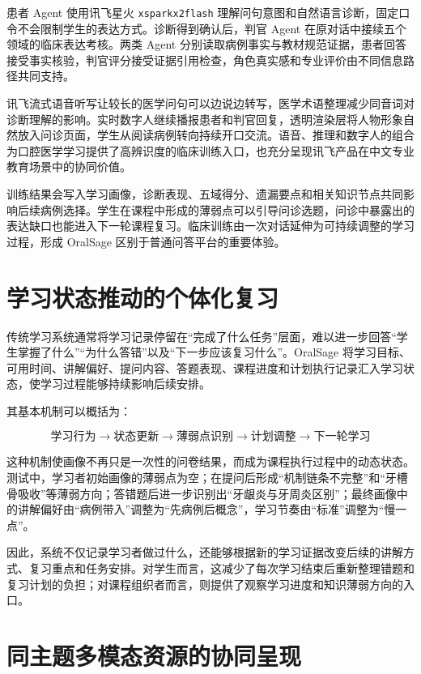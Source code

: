 患者 Agent 使用讯飞星火 \texttt{xsparkx2flash} 理解问句意图和自然语言诊断，固定口令不会限制学生的表达方式。诊断得到确认后，判官 Agent 在原对话中接续五个领域的临床表达考核。两类 Agent 分别读取病例事实与教材规范证据，患者回答接受事实核验，判官评分接受证据引用检查，角色真实感和专业评价由不同信息路径共同支持。

讯飞流式语音听写让较长的医学问句可以边说边转写，医学术语整理减少同音词对诊断理解的影响。实时数字人继续播报患者和判官回复，透明渲染层将人物形象自然放入问诊页面，学生从阅读病例转向持续开口交流。语音、推理和数字人的组合为口腔医学学习提供了高辨识度的临床训练入口，也充分呈现讯飞产品在中文专业教育场景中的协同价值。

训练结果会写入学习画像，诊断表现、五域得分、遗漏要点和相关知识节点共同影响后续病例选择。学生在课程中形成的薄弱点可以引导问诊选题，问诊中暴露出的表达缺口也能进入下一轮课程复习。临床训练由一次对话延伸为可持续调整的学习过程，形成 OralSage 区别于普通问答平台的重要体验。

\section{学习状态推动的个体化复习}

传统学习系统通常将学习记录停留在“完成了什么任务”层面，难以进一步回答“学生掌握了什么”“为什么答错”以及“下一步应该复习什么”。OralSage 将学习目标、可用时间、讲解偏好、提问内容、答题表现、课程进度和计划执行记录汇入学习状态，使学习过程能够持续影响后续安排。

其基本机制可以概括为：

\[
\text{学习行为}
\rightarrow
\text{状态更新}
\rightarrow
\text{薄弱点识别}
\rightarrow
\text{计划调整}
\rightarrow
\text{下一轮学习}
\]

这种机制使画像不再只是一次性的问卷结果，而成为课程执行过程中的动态状态。测试中，学习者初始画像的薄弱点为空；在提问后形成“机制链条不完整”和“牙槽骨吸收”等薄弱方向；答错题后进一步识别出“牙龈炎与牙周炎区别”；最终画像中的讲解偏好由“病例带入”调整为“先病例后概念”，学习节奏由“标准”调整为“慢一点”。

因此，系统不仅记录学习者做过什么，还能够根据新的学习证据改变后续的讲解方式、复习重点和任务安排。对学生而言，这减少了每次学习结束后重新整理错题和复习计划的负担；对课程组织者而言，则提供了观察学习进度和知识薄弱方向的入口。

\section{同主题多模态资源的协同呈现}

